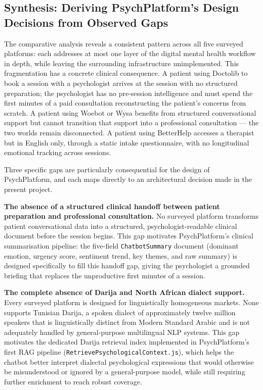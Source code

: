 \documentclass[a4paper,12pt]{report}
\begin{document}
\subsection{Synthesis: Deriving PsychPlatform's Design Decisions from Observed Gaps}
\label{subsec:synthesis}
 
The comparative analysis reveals a consistent pattern across all five surveyed platforms:
each addresses at most one layer of the digital mental health workflow in depth, while
leaving the surrounding infrastructure unimplemented. This fragmentation has a concrete
clinical consequence. A patient using Doctolib to book a session with a psychologist
arrives at the session with no structured preparation; the psychologist has no pre-session
intelligence and must spend the first minutes of a paid consultation reconstructing the
patient's concerns from scratch. A patient using Woebot or Wysa benefits from structured
conversational support but cannot transition that support into a professional consultation
— the two worlds remain disconnected. A patient using BetterHelp accesses a therapist
but in English only, through a static intake questionnaire, with no longitudinal emotional
tracking across sessions.
 
Three specific gaps are particularly consequential for the design of PsychPlatform,
and each maps directly to an architectural decision made in the present project.
 
\textbf{The absence of a structured clinical handoff between patient preparation and
professional consultation.} No surveyed platform transforms patient conversational data
into a structured, psychologist-readable clinical document before the session begins. This
gap motivates PsychPlatform's clinical summarisation pipeline: the five-field
\texttt{ChatbotSummary} document (dominant emotion, urgency score, sentiment trend,
key themes, and raw summary) is designed specifically to fill this handoff gap, giving
the psychologist a grounded briefing that replaces the unproductive first minutes of
a session.
 
\textbf{The complete absence of Darija and North African dialect support.} Every
surveyed platform is designed for linguistically homogeneous markets. None supports
Tunisian Darija, a spoken dialect of approximately twelve million speakers that is
linguistically distinct from Modern Standard Arabic and is not adequately handled by
general-purpose multilingual NLP systems. This gap motivates the dedicated Darija
retrieval index implemented in PsychPlatform's first RAG pipeline
(\texttt{RetrievePsychologicalContext.js}), which helps the chatbot better interpret
dialectal psychological expressions that would otherwise be misunderstood or ignored by a
general-purpose model, while still requiring further enrichment to reach robust coverage.
 
\end{document}

